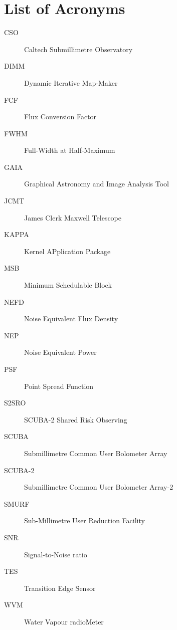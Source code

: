 \documentclass[twoside,11pt]{article}
\newcommand{\xlabel}[1]{}
\renewcommand{\_}{\texttt{\symbol{95}}}
\begin{document}
\section{\xlabel{acronyms}List of Acronyms}

\begin{description}

\item[CSO]\quad Caltech Submillimetre Observatory

\item[DIMM]\quad Dynamic Iterative Map-Maker

\item[FCF]\quad Flux Conversion Factor

\item[FWHM]\quad Full-Width at Half-Maximum

\item[GAIA]\quad Graphical Astronomy and Image Analysis Tool

\item[JCMT]\quad James Clerk Maxwell Telescope

\item[KAPPA]\quad Kernel APplication Package

\item[MSB]\quad Minimum  Schedulable Block

\item[NEFD]\quad Noise Equivalent Flux Density

\item[NEP]\quad Noise Equivalent Power

\item[PSF]\quad Point Spread Function

\item[S2SRO]\quad SCUBA-2 Shared Risk Observing

\item[SCUBA]\quad Submillimetre Common User Bolometer Array

\item[SCUBA-2]\quad Submillimetre Common User Bolometer Array-2

\item[SMURF]\quad Sub-Millimetre User Reduction Facility

\item[SNR]\quad Signal-to-Noise ratio

\item[TES]\quad Transition Edge Sensor

\item[WVM]\quad Water Vapour radioMeter


\end{description}
\end{document}

